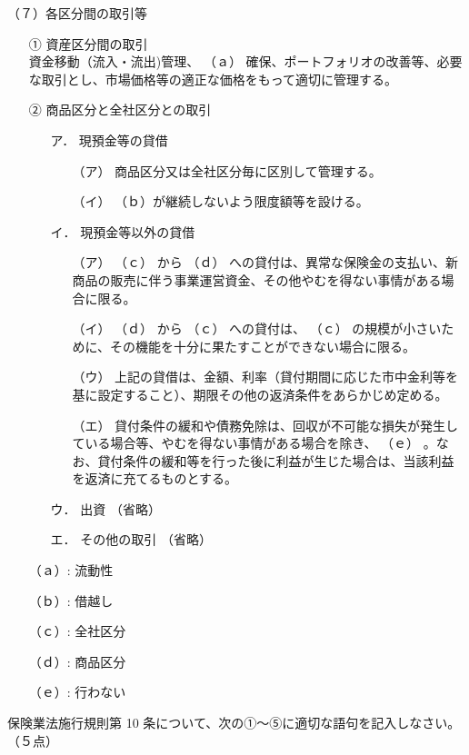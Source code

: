 \documentclass[report,gutter=10mm,fore-edge=10mm,uplatex,dvipdfmx]{jlreq}
\begin{document}
（７）各区分間の取引等
\begin{itemize}
\item[①] 資産区分間の取引\\
資金移動（流入・流出)管理、 （ａ） 確保、ポートフォリオの改善等、必要な取引とし、市場価格等の適正な価格をもって適切に管理する。
\item[②]商品区分と全社区分との取引\\
\begin{itemize}
\item[ア．] 現預金等の貸借
\begin{itemize}
\item[（ア）] 商品区分又は全社区分毎に区別して管理する。
\item[（イ）] （ｂ）が継続しないよう限度額等を設ける。
\end{itemize}
\item[イ．] 現預金等以外の貸借
\begin{itemize}
\item[（ア）]  （ｃ） から （ｄ） への貸付は、異常な保険金の支払い、新商品の販売に伴う事業運営資金、その他やむを得ない事情がある場合に限る。
\item[（イ）]  （ｄ） から （ｃ） への貸付は、 （ｃ） の規模が小さいために、その機能を十分に果たすことができない場合に限る。
\item[（ウ）] 上記の貸借は、金額、利率（貸付期間に応じた市中金利等を基に設定すること）、期限その他の返済条件をあらかじめ定める。
\item[（エ）] 貸付条件の緩和や債務免除は、回収が不可能な損失が発生している場合等、やむを得ない事情がある場合を除き、 （ｅ） 。なお、貸付条件の緩和等を行った後に利益が生じた場合は、当該利益を返済に充てるものとする。
\end{itemize}
\item[ウ．] 出資 （省略）
\item[エ．] その他の取引 （省略）
\end{itemize}
\end{itemize}

\answer{}
\begin{itemize}
\item[ （ａ）: ]  流動性
\item[ （ｂ）: ]  借越し
\item[ （ｃ）: ]  全社区分
\item[ （ｄ）: ]  商品区分
\item[ （ｅ）: ]  行わない
\end{itemize}

保険業法施行規則第 10 条について、次の①～⑤に適切な語句を記入しなさい。（５点）
\end{document}
